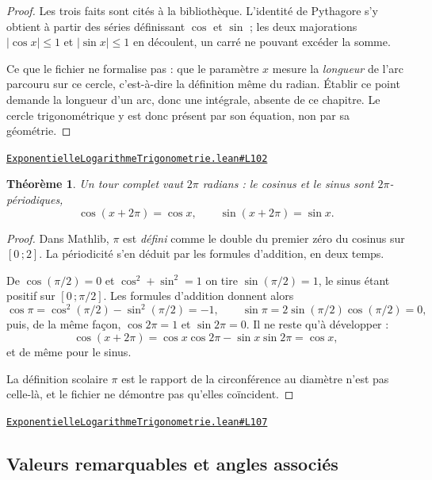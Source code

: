 \documentclass[11pt,a4paper]{article}
\theoremstyle{definition}
\theoremstyle{plain}
\newtheorem{theoreme}{Théorème}
\newcommand{\source}[2]{\par\smallskip\noindent\hfill{\footnotesize\href{#1}{\texttt{#2}}}\par\smallskip}
\begin{document}
\begin{proof}
Les trois faits sont cités à la bibliothèque. L'identité de Pythagore s'y obtient à partir
des séries définissant $\cos$ et $\sin$ ; les deux majorations $|\cos x| \le 1$ et
$|\sin x| \le 1$ en découlent, un carré ne pouvant excéder la somme.

\medskip\noindent
Ce que le fichier ne formalise pas : que le paramètre $x$ mesure la \emph{longueur} de
l'arc parcouru sur ce cercle, c'est-à-dire la définition même du radian. Établir ce point
demande la longueur d'un arc, donc une intégrale, absente de ce chapitre. Le cercle
trigonométrique y est donc présent par son équation, non par sa géométrie.
\end{proof}
\source{https://github.com/Commutator-IO/learn-lean/blob/main/courses/02-lycee/05-exponentielle-logarithme-trigonometrie/ExponentielleLogarithmeTrigonometrie.lean\#L102}{ExponentielleLogarithmeTrigonometrie.lean\#L102}

\begin{theoreme}
Un tour complet vaut $2\pi$ radians : le cosinus et le sinus sont $2\pi$-périodiques,
\[ \cos(x + 2\pi) = \cos x, \qquad \sin(x + 2\pi) = \sin x . \]
\end{theoreme}

\begin{proof}
Dans Mathlib, $\pi$ est \emph{défini} comme le double du premier zéro du cosinus sur
$[0\,;2]$. La périodicité s'en déduit par les formules d'addition, en deux temps.

De $\cos(\pi/2) = 0$ et $\cos^2 + \sin^2 = 1$ on tire $\sin(\pi/2) = 1$, le sinus étant
positif sur $[0\,;\pi/2]$. Les formules d'addition donnent alors
\[ \cos \pi = \cos^2(\pi/2) - \sin^2(\pi/2) = -1 , \qquad
   \sin \pi = 2\sin(\pi/2)\cos(\pi/2) = 0 , \]
puis, de la même façon, $\cos 2\pi = 1$ et $\sin 2\pi = 0$. Il ne reste qu'à développer :
\[ \cos(x + 2\pi) = \cos x \cos 2\pi - \sin x \sin 2\pi = \cos x , \]
et de même pour le sinus.

La définition scolaire \textemdash{} $\pi$ est le rapport de la circonférence au diamètre
\textemdash{} n'est pas celle-là, et le fichier ne démontre pas qu'elles coïncident.
\end{proof}
\source{https://github.com/Commutator-IO/learn-lean/blob/main/courses/02-lycee/05-exponentielle-logarithme-trigonometrie/ExponentielleLogarithmeTrigonometrie.lean\#L107}{ExponentielleLogarithmeTrigonometrie.lean\#L107}

\subsection{Valeurs remarquables et angles associés}
\end{document}
